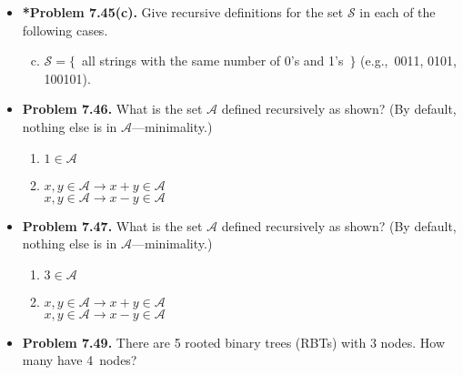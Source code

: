 \documentclass[11pt]{article}
\def\imp{\rightarrow}
\begin{document}
\begin{itemize}
\vspace{0.1in}

\item \textbf{*Problem 7.45(c).}
Give recursive definitions for the set $\mathcal{S}$ in each of the following cases.
\begin{enumerate}[(a)]
\setcounter{enumi}{2}
\item $\mathcal{S}=\{$\ all strings with the same number of 0's and 1's\ $\}$
  (e.g.,~0011, 0101, 100101).
\end{enumerate}

\vspace{0.1in}

\item \textbf{Problem 7.46.}
What is the set $\mathcal{A}$ defined recursively as shown?
(By default, nothing else is in $\mathcal{A}$---minimality.)
\begin{enumerate}[(1)]
\item $1\in\mathcal{A}$
\item $x,y\in\mathcal{A}\imp x+y\in\mathcal{A}$ \\
  $x,y\in\mathcal{A}\imp x-y\in\mathcal{A}$
\end{enumerate}

\vspace{0.1in}

\item \textbf{Problem 7.47.}
What is the set $\mathcal{A}$ defined recursively as shown?
(By default, nothing else is in $\mathcal{A}$---minimality.)
\begin{enumerate}[(1)]
\item $3\in\mathcal{A}$
\item $x,y\in\mathcal{A}\imp x+y\in\mathcal{A}$ \\
  $x,y\in\mathcal{A}\imp x-y\in\mathcal{A}$
\end{enumerate}

\vspace{0.1in}

\item \textbf{Problem 7.49.}
There are 5 rooted binary trees (RBTs) with 3 nodes.
How many have 4~nodes?

\vspace{0.1in}


\end{itemize}
\end{document}
